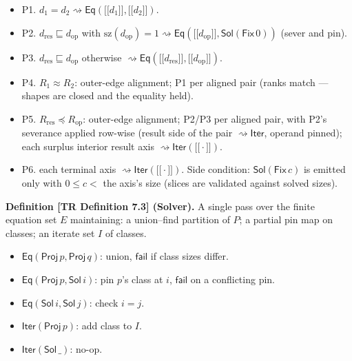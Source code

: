 \documentclass[
  10pt,
  letterpaper,
]{article}
\providecommand{\tightlist}{%
  \setlength{\itemsep}{0pt}\setlength{\parskip}{0pt}}
\providecommand{\llbracket}{\mathopen{[\![}}
\providecommand{\rrbracket}{\mathclose{]\!]}}
\begin{document}
\begin{itemize}
\tightlist
\item
  P1.
  \(d_1 = d_2 \rightsquigarrow \mathsf{Eq}(\llbracket d_1\rrbracket, \llbracket d_2 \rrbracket)\).
\item
  P2. \(d_{\mathrm{res}} \sqsubseteq d_{\mathrm{op}}\) with
  \(\mathrm{sz}(d_{\mathrm{op}}) = 1 \rightsquigarrow \mathsf{Eq}(\llbracket d_{\mathrm{op}}\rrbracket, \mathsf{Sol}(\mathsf{Fix}\,0))\)
  (sever and pin).
\item
  P3. \(d_{\mathrm{res}} \sqsubseteq d_{\mathrm{op}}\) otherwise
  \(\rightsquigarrow \mathsf{Eq}(\llbracket d_{\mathrm{res}}\rrbracket, \llbracket d_{\mathrm{op}}\rrbracket)\).
\item
  P4. \(R_1 \approx R_2\): outer-edge alignment; P1 per aligned pair
  (ranks match --- shapes are closed and the equality held).
\item
  P5. \(R_{\mathrm{res}} \preceq R_{\mathrm{op}}\): outer-edge
  alignment; P2/P3 per aligned pair, with P2's severance applied
  row-wise (result side of the pair \(\rightsquigarrow \mathsf{Iter}\),
  operand pinned); each surplus interior result axis
  \(\rightsquigarrow \mathsf{Iter}(\llbracket\cdot\rrbracket)\).
\item
  P6. each terminal axis
  \(\rightsquigarrow \mathsf{Iter}(\llbracket\cdot\rrbracket)\). Side
  condition: \(\mathsf{Sol}(\mathsf{Fix}\,c)\) is emitted only with
  \(0 \le c <\) the axis's size (slices are validated against solved
  sizes).
\end{itemize}

\textbf{Definition {[}TR Definition 7.3{]} (Solver).} A single pass over
the finite equation set \(E\) maintaining: a union--find partition of
\(P\); a partial pin map on classes; an iterate set \(I\) of classes.

\begin{itemize}
\tightlist
\item
  \(\mathsf{Eq}(\mathsf{Proj}\,p, \mathsf{Proj}\,q)\): union,
  \(\mathsf{fail}\) if class sizes differ.
\item
  \(\mathsf{Eq}(\mathsf{Proj}\,p, \mathsf{Sol}\,i)\): pin \(p\)'s class
  at \(i\), \(\mathsf{fail}\) on a conflicting pin.
\item
  \(\mathsf{Eq}(\mathsf{Sol}\,i, \mathsf{Sol}\,j)\): check \(i = j\).
\item
  \(\mathsf{Iter}(\mathsf{Proj}\,p)\): add class to \(I\).
\item
  \(\mathsf{Iter}(\mathsf{Sol}\,\_)\): no-op.
\end{itemize}
\end{document}
